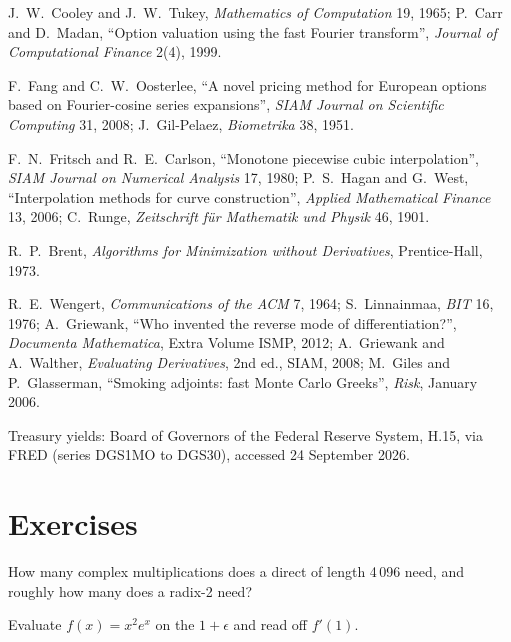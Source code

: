 \begin{omsources}
\item J.~W.~Cooley and J.~W.~Tukey, \emph{Mathematics of Computation} 19, 1965; P.~Carr and D.~Madan, ``Option valuation using the fast Fourier transform'', \emph{Journal of Computational Finance} 2(4), 1999.
\item F.~Fang and C.~W.~Oosterlee, ``A novel pricing method for European options based on Fourier-cosine series expansions'', \emph{SIAM Journal on Scientific Computing} 31, 2008; J.~Gil-Pelaez, \emph{Biometrika} 38, 1951.
\item F.~N.~Fritsch and R.~E.~Carlson, ``Monotone piecewise cubic interpolation'', \emph{SIAM Journal on Numerical Analysis} 17, 1980; P.~S.~Hagan and G.~West, ``Interpolation methods for curve construction'',
\emph{Applied Mathematical Finance} 13, 2006; C.~Runge, \emph{Zeitschrift für Mathematik und Physik} 46, 1901.
\item R.~P.~Brent, \emph{Algorithms for Minimization without Derivatives}, Prentice-Hall, 1973.
\item R.~E.~Wengert, \emph{Communications of the ACM} 7, 1964; S.~Linnainmaa, \emph{BIT} 16, 1976; A.~Griewank, ``Who invented the reverse mode of differentiation?'', \emph{Documenta Mathematica}, Extra Volume ISMP, 2012; A.~Griewank and A.~Walther, \emph{Evaluating Derivatives}, 2nd ed., SIAM, 2008; M.~Giles and P.~Glasserman,
``Smoking adjoints: fast Monte Carlo Greeks'', \emph{Risk}, January 2006.
\item Treasury yields: Board of Governors of the Federal Reserve System, H.15, via FRED (series DGS1MO to DGS30), accessed 24 September 2026.
\end{omsources}

\section{Exercises}

\begin{exercise}[$\star$]\label{exo:qm:transforms-interpolation-and-algorithmic-differentiation:1}
How many complex multiplications does a direct  of length 4\,096 need, and roughly how many does a radix-2  need?
\end{exercise}

\begin{exercise}[$\star$]\label{exo:qm:transforms-interpolation-and-algorithmic-differentiation:2}
Evaluate $f(x) = x^2e^x$ on the  $1 + \epsilon$ and read off $f'(1)$.
\end{exercise}

